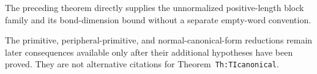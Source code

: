 \documentclass{article}
\begin{document}
The preceding theorem
 directly
supplies the unnormalized positive-length block family and its bond-dimension
bound without a separate empty-word convention.

The primitive, peripheral-primitive, and normal-canonical-form reductions
remain later consequences available only after their additional hypotheses
have been proved. They are not alternative citations for
Theorem~\texttt{Th:TIcanonical}.



\end{document}
